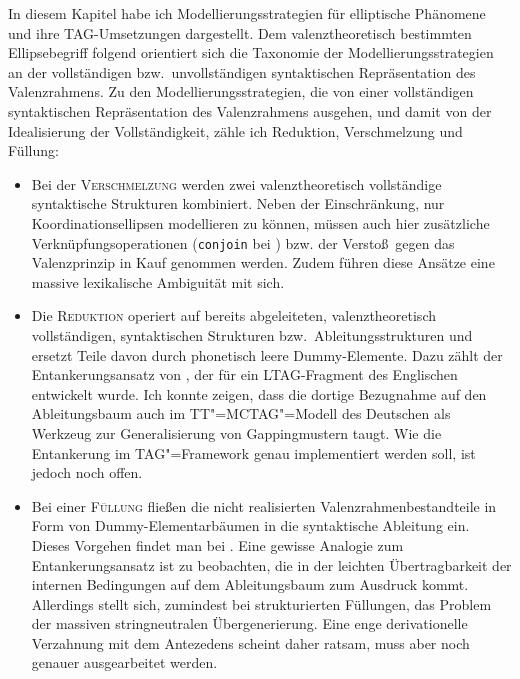 In diesem Kapitel habe ich Modellierungsstrategien für elliptische Phänomene und ihre TAG-Umsetzungen dargestellt. Dem valenztheoretisch bestimmten Ellipsebegriff folgend orientiert sich die Taxonomie der Modellierungsstrategien an der vollständigen bzw.\ unvollständigen syntaktischen Repräsentation des Valenzrahmens. %
Zu den Modellierungsstrategien, die von einer vollständigen syntaktischen Repräsentation des Valenzrahmens ausgehen, und damit von der Idealisierung der Vollständigkeit, zähle ich Reduktion, Verschmelzung und Füllung:
\begin{itemize}
  \item Bei der \textsc{Verschmelzung} werden zwei valenztheoretisch vollständige syntaktische Strukturen kombiniert. Neben der Einschränkung, nur Koordinationsellipsen modellieren zu können, müssen auch hier zusätzliche Verknüpfungsoperationen ({\tt conjoin} bei \citealt{Sarkar:Joshi:96,Sarkar:Joshi:97}) bzw. der Versto\ss\ gegen das Valenzprinzip \citep{Seddah:08,Seddah:etal:10} in Kauf genommen werden. Zudem führen diese Ansätze eine massive lexikalische Ambiguität mit sich.  
  \item Die \textsc{Reduktion} operiert auf bereits abgeleiteten, valenztheoretisch vollständigen, syntaktischen Strukturen bzw.\ Ableitungsstrukturen und ersetzt Teile davon durch phonetisch leere Dummy-Elemente. Dazu zählt der Entankerungsansatz von \cite{Lichte:Kallmeyer:10}, der für ein LTAG-Fragment des Englischen entwickelt wurde. Ich konnte zeigen, dass die dortige Bezugnahme auf den Ableitungsbaum auch im TT"=MCTAG"=Modell des Deutschen als Werkzeug zur Generalisierung von Gappingmustern taugt. Wie die Entankerung im TAG"=Framework genau implementiert werden soll, ist jedoch noch offen.
  \item Bei einer \textsc{Füllung} flie\ss en die nicht realisierten Valenzrahmenbestandteile in Form von Dummy-Elementarbäumen in die syntaktische Ableitung ein. Dieses Vorgehen findet man bei \cite{Seddah:Sagot:06}. Eine gewisse Analogie zum Entankerungsansatz ist zu beobachten, die in der leichten Übertragbarkeit der internen Bedingungen auf dem Ableitungsbaum zum Ausdruck kommt. Allerdings stellt sich, zumindest bei strukturierten Füllungen, das Problem der massiven stringneutralen Übergenerierung. Eine enge derivationelle Verzahnung mit dem Antezedens scheint daher ratsam, muss aber noch genauer ausgearbeitet werden. 
\end{itemize}

